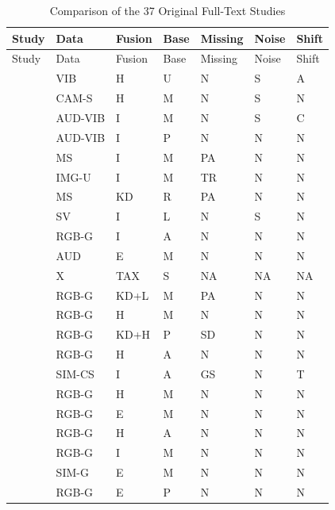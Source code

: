 \begin{longtable}{@{}p{}llllll@{}}
\caption{Comparison of the 37 Original Full-Text Studies}\label{tab:literature-matrix}\\
\toprule Study & Data & Fusion & Base & Missing & Noise & Shift \\
\midrule\endfirsthead
\toprule Study & Data & Fusion & Base & Missing & Noise & Shift \\
\midrule\endhead
\parencite{Wang2025A} & VIB & H & U & N & S & A \\
\parencite{Ying2025Trustworthy} & CAM-S & H & M & N & S & N \\
\parencite{Huang2026Rolling} & AUD-VIB & I & M & N & S & C \\
\parencite{Gu2024Improved} & AUD-VIB & I & P & N & N & N \\
\parencite{Yang2024Fault} & MS & I & M & PA & N & N \\
\parencite{Ma2025A} & IMG-U & I & M & TR & N & N \\
\parencite{Li2025PGMTKD} & MS & KD & R & PA & N & N \\
\parencite{AlDulaimi2019A} & SV & I & L & N & S & N \\
\parencite{Li2025MADFlow} & RGB-G & I & A & N & N & N \\
\parencite{Wan2024Pipeline} & AUD & E & M & N & N & N \\
\parencite{Baltrusaitis2019Multimodal} & X & TAX & S & NA & NA & NA \\
\parencite{Sui2026Incomplete} & RGB-G & KD+L & M & PA & N & N \\
\parencite{Cheng2025Multimodal} & RGB-G & H & M & N & N & N \\
\parencite{Xu2025ModalityResilient} & RGB-G & KD+H & P & SD & N & N \\
\parencite{Shangguan2025CPIR} & RGB-G & H & A & N & N & N \\
\parencite{Altinses2025Performance} & SIM-CS & I & A & GS & N & T \\
\parencite{Wang2023Multimodal} & RGB-G & H & M & N & N & N \\
\parencite{Horwitz2023Back} & RGB-G & E & M & N & N & N \\
\parencite{Costanzino2024Multimodal} & RGB-G & H & A & N & N & N \\
\parencite{Rudolph2023Asymmetric} & RGB-G & I & M & N & N & N \\
\parencite{Bonfiglioli2023The} & SIM-G & E & M & N & N & N \\
\parencite{Bergmann2022The} & RGB-G & E & P & N & N & N \\

\end{longtable}
